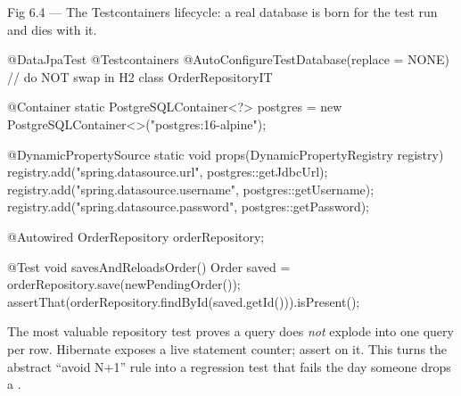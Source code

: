 \begin{wbfigure}{Fig 6.4 --- The Testcontainers lifecycle: a real database is born for the test run and dies with it.}
\end{wbfigure}

\begin{javabox}
@DataJpaTest
@Testcontainers
@AutoConfigureTestDatabase(replace = NONE)  // do NOT swap in H2
class OrderRepositoryIT {

  @Container
  static PostgreSQLContainer<?> postgres =
      new PostgreSQLContainer<>("postgres:16-alpine");

  @DynamicPropertySource
  static void props(DynamicPropertyRegistry registry) {
    registry.add("spring.datasource.url", postgres::getJdbcUrl);
    registry.add("spring.datasource.username", postgres::getUsername);
    registry.add("spring.datasource.password", postgres::getPassword);
  }

  @Autowired OrderRepository orderRepository;

  @Test
  void savesAndReloadsOrder() {
    Order saved = orderRepository.save(newPendingOrder());
    assertThat(orderRepository.findById(saved.getId())).isPresent();
  }
}
\end{javabox}

 The most valuable repository test proves a query does \emph{not} explode into one query per row. Hibernate exposes a live statement counter; assert on it. This turns the abstract ``avoid N+1'' rule into a regression test that fails the day someone drops a .

